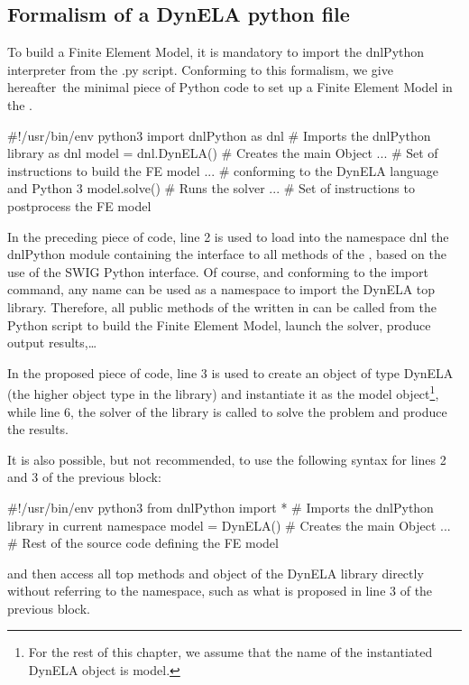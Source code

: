 \subsection{Formalism of a DynELA python file}

To build a Finite Element Model, it is mandatory to import the \textsf{dnlPython} interpreter from the \textsf{.py} script. Conforming to this formalism, we give hereafter the minimal piece of Python code to set up a Finite Element Model in the \DynELA.

\begin{PythonListing}
#!/usr/bin/env python3
import dnlPython as dnl # Imports the dnlPython library as dnl
model = dnl.DynELA()    # Creates the main Object
...                     # Set of instructions to build the FE model
...                     # conforming to the DynELA language and Python 3
model.solve()           # Runs the solver
...                     # Set of instructions to postprocess the FE model
\end{PythonListing}

In the preceding piece of code, line 2 is used to load into the namespace \textsf{dnl} the \textsf{dnlPython} module containing the interface to all \Cpp methods of the \DynELA, based on the use of the SWIG Python interface. Of course, and conforming to the \textsf{import} command, any name can be used as a namespace to import the DynELA top library. Therefore, all public methods of the \DynELA written in \Cpp can be called from the Python script to build the Finite Element Model, launch the solver, produce output results,\ldots

In the proposed piece of code, line 3 is used to create an object of type \textsf{DynELA} (the higher object type in the \DynELA library) and instantiate it as the \textsf{model} object\footnote{For the rest of this chapter, we assume that the name of the instantiated \textsf{DynELA} object is \textsf{model}.}, while line 6, the solver of the \DynELA library is called to solve the problem and produce the results.

It is also possible, but not recommended, to use the following syntax for lines 2 and 3 of the previous block:
\begin{PythonListing}
#!/usr/bin/env python3
from dnlPython import * # Imports the dnlPython library in current namespace
model = DynELA()        # Creates the main Object
...                     # Rest of the source code defining the FE model
\end{PythonListing}
and then access all top methods and object of the DynELA library directly without referring to the namespace, such as what is proposed in line 3 of the previous block.

